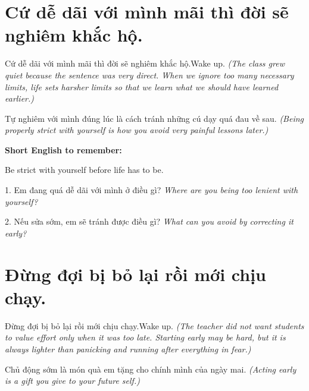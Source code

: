 \section{Cứ dễ dãi với mình mãi thì đời sẽ nghiêm khắc hộ.}
\begin{truyen}{Cứ dễ dãi với mình mãi thì đời sẽ nghiêm khắc hộ.}{Wake up.}
\textit{(The class grew quiet because the sentence was very direct. When we ignore too many necessary limits, life sets harsher limits so that we learn what we should have learned earlier.)}
\end{truyen}

\begin{baihoc}
Tự nghiêm với mình đúng lúc là cách tránh những cú dạy quá đau về sau.
\textit{(Being properly strict with yourself is how you avoid very painful lessons later.)}
\end{baihoc}

\begin{ghinhoanh}
\textbf{Short English to remember:}

Be strict with yourself before life has to be.

\end{ghinhoanh}

\begin{tuhocnhanh}
1. Em đang quá dễ dãi với mình ở điều gì? \textit{Where are you being too lenient with yourself?}

2. Nếu sửa sớm, em sẽ tránh được điều gì? \textit{What can you avoid by correcting it early?}
\end{tuhocnhanh}
\ngancach

\section{Đừng đợi bị bỏ lại rồi mới chịu chạy.}
\begin{truyen}{Đừng đợi bị bỏ lại rồi mới chịu chạy.}{Wake up.}
\textit{(The teacher did not want students to value effort only when it was too late. Starting early may be hard, but it is always lighter than panicking and running after everything in fear.)}
\end{truyen}

\begin{baihoc}
Chủ động sớm là món quà em tặng cho chính mình của ngày mai.
\textit{(Acting early is a gift you give to your future self.)}
\end{baihoc}


